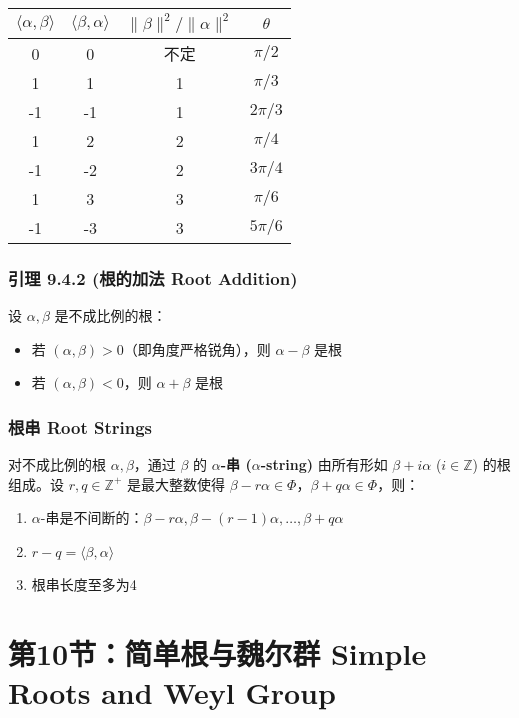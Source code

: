 \begin{table}[h]
	\centering
	\begin{tabular}{|c|c|c|c|}
		\hline
		$\langle\alpha, \beta\rangle$ & $\langle\beta, \alpha\rangle$ & $\|\beta\|^2/\|\alpha\|^2$ & $\theta$ \\
		\hline
		0 & 0 & 不定 & $\pi/2$ \\
		\hline
		1 & 1 & 1 & $\pi/3$ \\
		\hline
		-1 & -1 & 1 & $2\pi/3$ \\
		\hline
		1 & 2 & 2 & $\pi/4$ \\
		\hline
		-1 & -2 & 2 & $3\pi/4$ \\
		\hline
		1 & 3 & 3 & $\pi/6$ \\
		\hline
		-1 & -3 & 3 & $5\pi/6$ \\
		\hline
	\end{tabular}
\end{table}
\subsubsection{引理 9.4.2 (根的加法 Root Addition)}

设 $\alpha, \beta$ 是不成比例的根：

\begin{itemize}
	\item 若 $(\alpha, \beta) > 0$（即角度严格锐角），则 $\alpha - \beta$ 是根
	\item 若 $(\alpha, \beta) < 0$，则 $\alpha + \beta$ 是根
\end{itemize}

\subsubsection{根串 Root Strings}

对不成比例的根 $\alpha, \beta$，通过 $\beta$ 的 \textbf{$\alpha$-串 ($\alpha$-string)} 由所有形如 $\beta + i\alpha$ ($i \in \mathbb{Z}$) 的根组成。设 $r, q \in \mathbb{Z}^+$ 是最大整数使得 $\beta - r\alpha \in \Phi$，$\beta + q\alpha \in \Phi$，则：

\begin{enumerate}
	\item $\alpha$-串是不间断的：$\beta - r\alpha, \beta - (r-1)\alpha, \ldots, \beta + q\alpha$
	\item $r - q = \langle\beta, \alpha\rangle$
	\item 根串长度至多为4
\end{enumerate}


\section{第10节：简单根与魏尔群 Simple Roots and Weyl Group}

